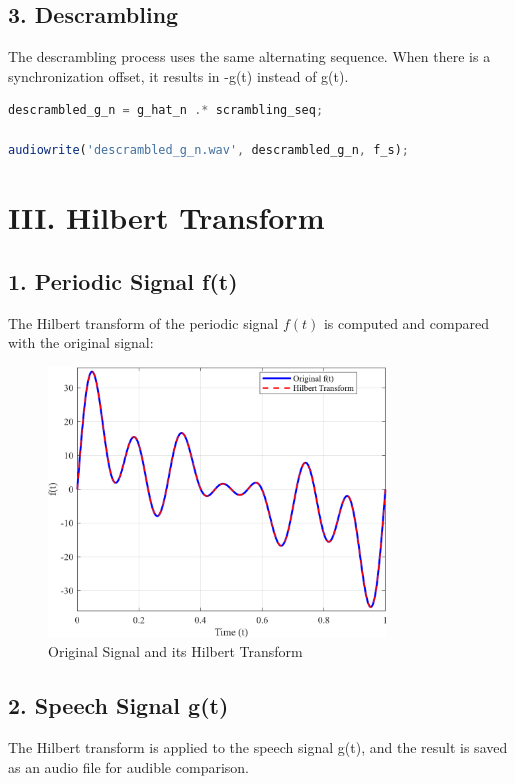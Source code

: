 \documentclass[12pt]{article}
\begin{document}
\newpage
\subsection*{3. Descrambling}
The descrambling process uses the same alternating sequence. When there is a synchronization offset, it results in -g(t) instead of g(t).

\begin{lstlisting}[language=Octave, caption=Descrambling]
descrambled_g_n = g_hat_n .* scrambling_seq;

audiowrite('descrambled_g_n.wav', descrambled_g_n, f_s);
\end{lstlisting}

\newpage
\section*{III. Hilbert Transform}

\subsection*{1. Periodic Signal f(t)}
The Hilbert transform of the periodic signal $f(t)$ is computed and compared with the original signal:

\begin{figure}[H]
    \centering
    \includegraphics[width=0.8\textwidth]{f_t.png}
    \caption{Original Signal and its Hilbert Transform}
\end{figure}


\newpage
\subsection*{2. Speech Signal g(t)}
The Hilbert transform is applied to the speech signal g(t), and the result is saved as an audio file for audible comparison.
\end{document}

